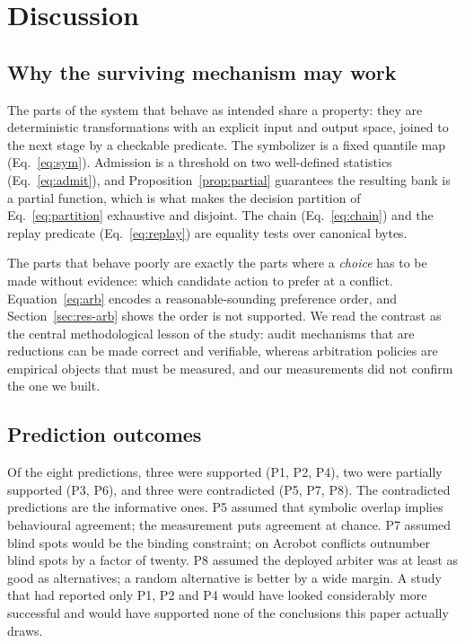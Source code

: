 \documentclass[11pt,a4paper]{article}
\begin{document}
\section{Discussion}
\label{sec:discussion}

\subsection{Why the surviving mechanism may work}

The parts of the system that behave as intended share a property: they are deterministic transformations with an explicit input and output space, joined to the next stage by a checkable predicate. The symbolizer is a fixed quantile map (Eq.~\eqref{eq:sym}). Admission is a threshold on two well-defined statistics (Eq.~\eqref{eq:admit}), and Proposition~\ref{prop:partial} guarantees the resulting bank is a partial function, which is what makes the decision partition of Eq.~\eqref{eq:partition} exhaustive and disjoint. The chain (Eq.~\eqref{eq:chain}) and the replay predicate (Eq.~\eqref{eq:replay}) are equality tests over canonical bytes.

The parts that behave poorly are exactly the parts where a \emph{choice} has to be made without evidence: which candidate action to prefer at a conflict. Equation~\eqref{eq:arb} encodes a reasonable-sounding preference order, and Section~\ref{sec:res-arb} shows the order is not supported. We read the contrast as the central methodological lesson of the study: audit mechanisms that are reductions can be made correct and verifiable, whereas arbitration policies are empirical objects that must be measured, and our measurements did not confirm the one we built.

\subsection{Prediction outcomes}

Of the eight predictions, three were supported (P1, P2, P4), two were partially supported (P3, P6), and three were contradicted (P5, P7, P8). The contradicted predictions are the informative ones. P5 assumed that symbolic overlap implies behavioural agreement; the measurement puts agreement at chance. P7 assumed blind spots would be the binding constraint; on Acrobot conflicts outnumber blind spots by a factor of twenty. P8 assumed the deployed arbiter was at least as good as alternatives; a random alternative is better by a wide margin. A study that had reported only P1, P2 and P4 would have looked considerably more successful and would have supported none of the conclusions this paper actually draws.
\end{document}
